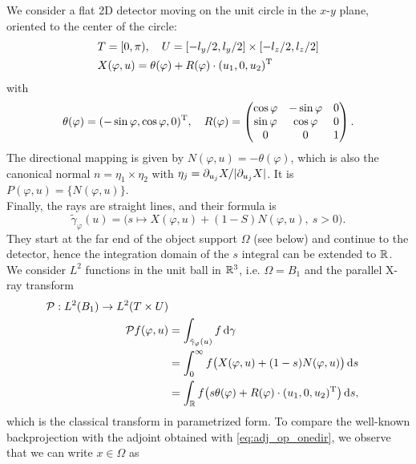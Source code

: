 \documentclass{amsart}
\renewcommand*{\phi}{\varphi}
\begin{document}
\begin{example}
 We consider a flat 2D detector moving on the unit circle in the $x$-$y$ plane, oriented to the center of the circle:
 \begin{align*}
  & T = [0, \pi),\quad U = [-l_y/2, l_y/2] \times [-l_z/2, l_z/2] \\
  & X(\phi, u) = \theta(\phi) + R(\phi) \cdot \TRANSP{(u_1, 0, u_2)}
 \end{align*}
 with
 \begin{equation}
  \theta(\phi) = \TRANSP{(-\sin\phi, \cos\phi, 0)},\quad R(\phi) =
  \begin{pmatrix}
   \cos\phi & -\sin\phi & 0 \\
   \sin\phi & \cos\phi & 0 \\
   0 & 0 & 1
  \end{pmatrix}.
 \end{equation}
 The directional mapping is given by $N(\phi, u) = -\theta(\phi)$, which is also the canonical normal $n = \eta_1 \times \eta_2$ with
 $\eta_j = \partial_{u_j} X / |\partial_{u_j} X|$. It is $P(\phi, u) = \lbrace N(\phi, u)\rbrace$.\\
 Finally, the rays are straight lines, and their formula is
 \begin{equation*}
  \tilde \gamma_\phi(u) = \big( s \mapsto X(\phi, u) + (1-S) N(\phi, u),\ s > 0 \big).
 \end{equation*}
 They start at the far end of the object support $\Omega$ (see below) and continue to the detector, hence the integration domain of the $s$ 
 integral can be extended to ${\mathbb{R}}$.\\[1ex]
 We consider $L^2$ functions in the unit ball in ${\mathbb{R}}^3$, i.e. $\Omega = B_1$ and the parallel X-ray transform
 \begin{align*}
  \OPP: L^2(B_1) \to L^2(T \times U) \\
  \OPP f(\phi, u) 
  &= \int_{\tilde \gamma_\phi(u)} f\, \D \gamma \\
  &= \int_0^\infty f\big(X(\phi, u) + (1-s) N(\phi, u)\big)\, \D s \\
  &= \int_\RR f\big(s \theta(\phi) + R(\phi) \cdot \TRANSP{(u_1, 0, u_2)}\big)\, \D s,
 \end{align*}
 which is the classical transform in parametrized form.
 To compare the well-known backprojection with the adjoint obtained with \eqref{eq:adj_op_onedir}, we observe that we can write $x \in 
 \Omega$ as
 \begin{align*}

\end{align*}
\end{example}
\end{document}
